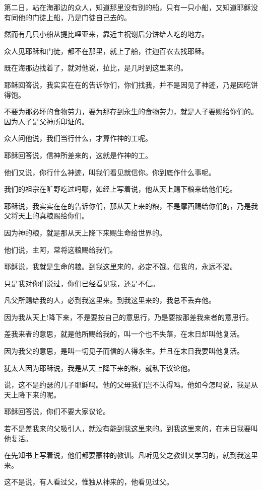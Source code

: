 \documentclass[12pt,oneside]{book}
\begin{document}
第二日，站在海那边的众人，知道那里没有别的船，只有一只小船，又知道耶稣没有同他的门徒上船，乃是门徒自己去的。

然而有几只小船从提比哩亚来，靠近主祝谢后分饼给人吃的地方。

众人见耶稣和门徒，都不在那里，就上了船，往迦百农去找耶稣。

既在海那边找着了，就对他说，拉比，是几时到这里来的。

耶稣回答说，我实实在在的告诉你们，你们找我，并不是因见了神迹，乃是因吃饼得饱。

不要为那必坏的食物劳力，要为那存到永生的食物劳力，就是人子要赐给你们的。因为人子是父神所印证的。

众人问他说，我们当行什么，才算作神的工呢。

耶稣回答说，信神所差来的，这就是作神的工。

他们又说，你行什么神迹，叫我们看见就信你。你到底作什么事呢。

我们的祖宗在旷野吃过吗哪，如经上写着说，他从天上赐下粮来给他们吃。

耶稣说，我实实在在的告诉你们，那从天上来的粮，不是摩西赐给你们的，乃是我父将天上的真粮赐给你们。

因为神的粮，就是那从天上降下来赐生命给世界的。

他们说，主阿，常将这粮赐给我们。

耶稣说，我就是生命的粮。到我这里来的，必定不饿。信我的，永远不渴。

只是我对你们说过，你们已经看见我，还是不信。

凡父所赐给我的人，必到我这里来。到我这里来的，我总不丢弃他。

因为我从天上!降下来，不是要按自己的意思行，乃是要按那差我来者的意思行。

差我来者的意思，就是他所赐给我的，叫一个也不失落，在末日却叫他复活。

因为我父的意思，是叫一切见子而信的人得永生。并且在末日我要叫他复活。

犹太人因为耶稣说，我是从天上降下来的粮，就私下议论他。

说，这不是约瑟的儿子耶稣吗。他的父母我们岂不认得吗。他如今怎吗说，我是从天上降下来的呢。

耶稣回答说，你们不要大家议论。

若不是差我来的父吸引人，就没有能到我这里来的。到我这里来的，在末日我要叫他复活。

在先知书上写着说，他们都要蒙神的教训。凡听见父之教训又学习的，就到我这里来。

这不是说，有人看过父，惟独从神来的，他看见过父。
\end{document}
